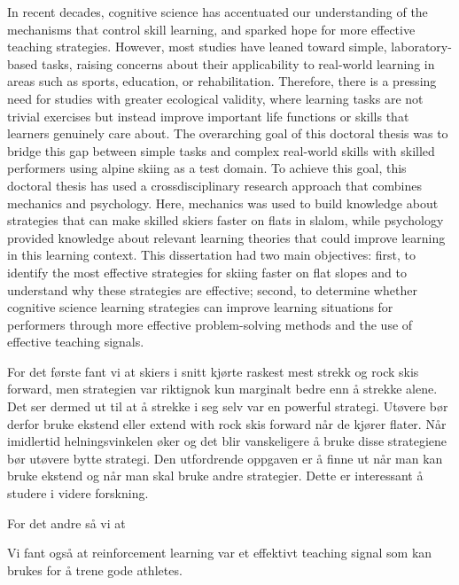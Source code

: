 In recent decades, cognitive science has accentuated our understanding of the mechanisms that control skill learning, and sparked hope for more effective teaching strategies. However, most studies have leaned toward simple, laboratory-based tasks, raising concerns about their applicability to real-world learning in areas such as sports, education, or rehabilitation. Therefore, there is a pressing need for studies with greater ecological validity, where learning tasks are not trivial exercises but instead improve important life functions or skills that learners genuinely care about. The overarching goal of this doctoral thesis was to bridge this gap between simple tasks and complex real-world skills with skilled performers using alpine skiing as a test domain. To achieve this goal, this doctoral thesis has used a crossdisciplinary research approach that combines mechanics and psychology. Here, mechanics was used to build knowledge about strategies that can make skilled skiers faster on flats in slalom, while psychology provided knowledge about relevant learning theories that could improve learning in this learning context. This dissertation had two main objectives: first, to identify the most effective strategies for skiing faster on flat slopes and to understand why these strategies are effective; second, to determine whether cognitive science learning strategies can improve learning situations for performers through more effective problem-solving methods and the use of effective teaching signals.

For det første fant vi at skiers i snitt kjørte raskest mest strekk og rock skis forward, men strategien var riktignok kun marginalt bedre enn å strekke alene. Det ser dermed ut til at å strekke i seg selv var en powerful strategi. Utøvere bør derfor bruke ekstend eller extend with rock skis forward når de kjører flater. Når imidlertid helningsvinkelen øker og det blir vanskeligere å bruke disse strategiene bør utøvere bytte strategi. Den utfordrende oppgaven er å finne ut når man kan bruke ekstend og når man skal bruke andre strategier. Dette er interessant å studere i videre forskning.

For det andre så vi at


Vi fant også at reinforcement learning var et effektivt teaching signal som kan brukes for å trene gode athletes. 















